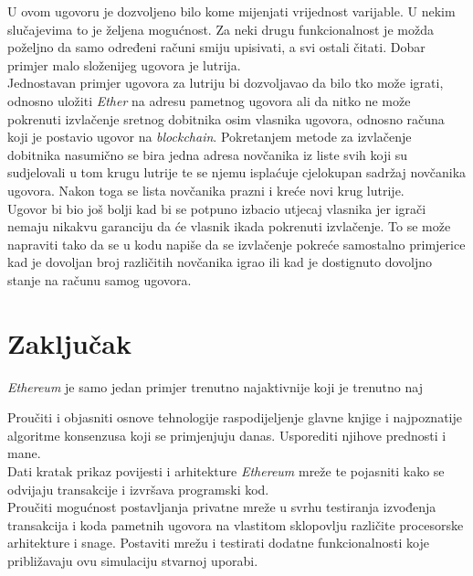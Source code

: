 \documentclass[times, utf8, zavrsni, numeric]{fer}
\begin{document}
U ovom ugovoru je dozvoljeno bilo kome mijenjati vrijednost varijable. U nekim slučajevima to je željena mogućnost. Za neki drugu funkcionalnost je možda poželjno da
samo određeni računi smiju upisivati, a svi ostali čitati. Dobar primjer malo složenijeg ugovora je lutrija. \\
Jednostavan primjer ugovora za lutriju bi dozvoljavao da bilo tko može igrati, odnosno uložiti \emph{Ether} na adresu pametnog ugovora ali da nitko ne može pokrenuti
izvlačenje sretnog dobitnika osim vlasnika ugovora, odnosno računa koji je postavio ugovor na \emph{blockchain}. Pokretanjem metode za izvlačenje dobitnika nasumično
se bira jedna adresa novčanika iz liste svih koji su sudjelovali u tom krugu lutrije te se njemu isplaćuje cjelokupan sadržaj novčanika ugovora. Nakon toga se lista
novčanika prazni i kreće novi krug lutrije. \\
Ugovor bi bio još bolji kad bi se potpuno izbacio utjecaj vlasnika jer igrači nemaju nikakvu garanciju da će vlasnik ikada pokrenuti izvlačenje. To se može napraviti
tako da se u kodu napiše da se izvlačenje pokreće samostalno primjerice kad je dovoljan broj različitih novčanika igrao ili kad je dostignuto dovoljno stanje na računu
samog ugovora.

\chapter{Zaključak}
\emph{Ethereum} je samo jedan primjer trenutno najaktivnije koji je trenutno naj





\begin{sazetak}
Proučiti i objasniti osnove tehnologije raspodijeljenje glavne knjige i najpoznatije algoritme konsenzusa koji se primjenjuju danas. Usporediti njihove prednosti i 
mane. \\
Dati kratak prikaz povijesti i arhitekture \emph{Ethereum} mreže te pojasniti kako se odvijaju transakcije i izvršava programski kod.\\
Proučiti mogućnost postavljanja privatne mreže u svrhu testiranja izvođenja transakcija i koda pametnih ugovora na vlastitom sklopovlju različite procesorske arhitekture
i snage. Postaviti mrežu i testirati dodatne funkcionalnosti koje približavaju ovu simulaciju stvarnoj uporabi.

\end{sazetak}
\end{document}
